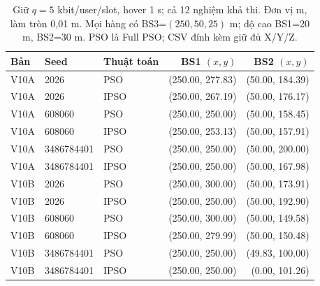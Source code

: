 \begin{table}
\centering\renewcommand{\arraystretch}{1.03}\setlength{\tabcolsep}{6pt}
\begin{tabular}{lllrr}\toprule
Bản & Seed & Thuật toán & BS1 $(x,y)$ & BS2 $(x,y)$ \\
\midrule
V10A & 2026 & PSO & (250.00, 277.83) & (50.00, 184.39) \\
V10A & 2026 & IPSO & (250.00, 267.19) & (50.00, 176.17) \\
V10A & 608060 & PSO & (250.00, 250.00) & (50.00, 158.45) \\
V10A & 608060 & IPSO & (250.00, 253.13) & (50.00, 157.91) \\
V10A & 3486784401 & PSO & (250.00, 250.00) & (50.00, 200.00) \\
V10A & 3486784401 & IPSO & (250.00, 250.00) & (50.00, 167.98) \\
\midrule
V10B & 2026 & PSO & (250.00, 300.00) & (50.00, 173.91) \\
V10B & 2026 & IPSO & (250.00, 250.00) & (50.00, 192.90) \\
V10B & 608060 & PSO & (250.00, 300.00) & (50.00, 149.58) \\
V10B & 608060 & IPSO & (250.00, 279.99) & (50.00, 150.48) \\
V10B & 3486784401 & PSO & (250.00, 250.00) & (49.83, 100.00) \\
V10B & 3486784401 & IPSO & (250.00, 250.00) & (0.00, 101.26) \\
\bottomrule\end{tabular}
\caption{Giữ $q=5$ kbit/user/slot, hover 1 s; cả 12 nghiệm khả thi. Đơn vị m, làm tròn 0,01 m. Mọi hàng có BS3=$(250,50,25)$ m; độ cao BS1=20 m, BS2=30 m. PSO là Full PSO; CSV đính kèm giữ đủ X/Y/Z.}\end{table}
